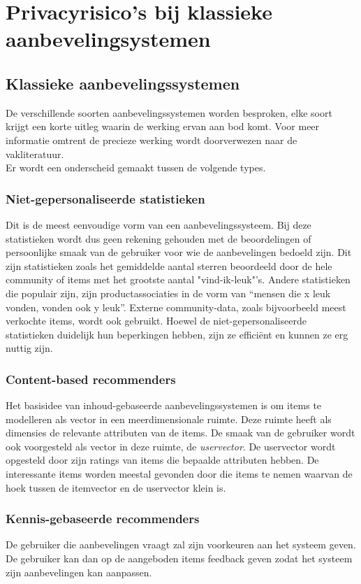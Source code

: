 \chapter{Privacyrisico's bij klassieke aanbevelingsystemen}
\label{privacyklassiek}

\section{Klassieke aanbevelingssystemen}
\label{sec:klassiek}
De verschillende soorten aanbevelingssystemen worden besproken, elke soort krijgt een korte uitleg waarin de werking ervan aan bod komt. Voor meer informatie omtrent de precieze werking wordt doorverwezen naar de vakliteratuur. \\Er wordt een onderscheid gemaakt tussen de volgende types.
\subsection{Niet-gepersonaliseerde statistieken}
Dit is de meest eenvoudige vorm van een aanbevelingssysteem. Bij deze statistieken wordt dus geen rekening gehouden met de beoordelingen of persoonlijke smaak van de gebruiker voor wie de aanbevelingen bedoeld zijn. Dit zijn statistieken zoals het gemiddelde aantal sterren beoordeeld door de hele community of items met het grootste aantal "vind-ik-leuk"'s. Andere statistieken die populair zijn, zijn productassociaties in de vorm van “mensen die x leuk vonden, vonden ook y leuk”. Externe community-data, zoals bijvoorbeeld meest verkochte items, wordt ook gebruikt.  Hoewel de niet-gepersonaliseerde statistieken duidelijk hun beperkingen hebben, zijn ze effici\"ent en kunnen ze erg nuttig zijn. 
\subsection{Content-based recommenders}
Het basisidee van inhoud-gebaseerde aanbevelingssystemen is om items te modelleren als vector in een meerdimensionale ruimte. Deze ruimte heeft als dimensies de relevante attributen van de items. De smaak van de gebruiker wordt ook voorgesteld als vector in deze ruimte, de \textit{uservector}. De uservector wordt opgesteld door zijn ratings van items die bepaalde attributen hebben. De interessante items worden meestal gevonden door die items te nemen waarvan de hoek tussen de itemvector en de uservector klein is. 
\subsection{Kennis-gebaseerde recommenders}
De gebruiker die aanbevelingen vraagt zal zijn voorkeuren aan het systeem geven. De gebruiker kan dan op de aangeboden items feedback geven zodat het systeem zijn aanbevelingen kan aanpassen.
